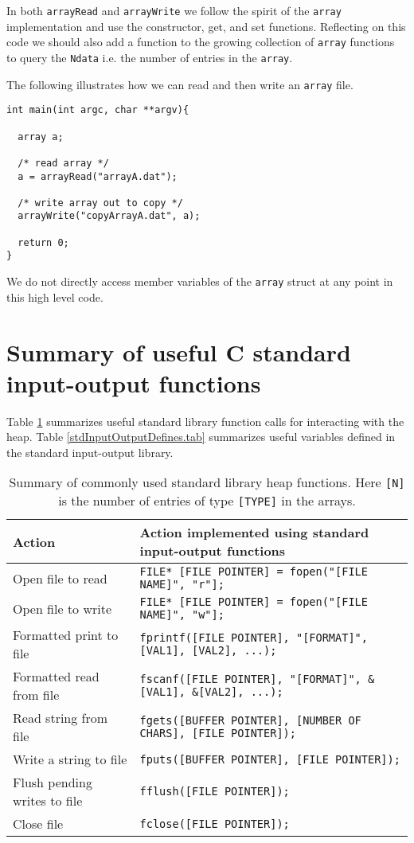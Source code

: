 In both \texttt{arrayRead} and \texttt{arrayWrite} we follow the spirit of the \texttt{array} implementation and use the constructor, get, and set functions. Reflecting on this code we should also add a function to the growing collection of \texttt{array} functions to query the \texttt{Ndata} i.e. the number of entries in the \texttt{array}.

The following illustrates how we can read and then write an \texttt{array} file.

\begin{verbatim}
int main(int argc, char **argv){

  array a;

  /* read array */
  a = arrayRead("arrayA.dat");

  /* write array out to copy */
  arrayWrite("copyArrayA.dat", a);

  return 0;
}
\end{verbatim}

We do not directly access member variables of the \texttt{array} struct at any point in this high level code.

\section{Summary of useful C standard input-output functions}

Table \ref{stdInputOutputFunctions.tab} summarizes useful standard library function calls for interacting with the heap. Table \ref{stdInputOutputDefines.tab} summarizes useful variables defined in the standard input-output library. 

\begin{table}[htbp!]
    \centering
    \begin{tabular}{l|l} \hline
      Action & Action implemented using standard input-output functions\\ \hline
        Open file to read&  \texttt{FILE* [FILE POINTER] =  fopen("[FILE NAME]", "r"];} \\
         Open file to write&  \texttt{FILE* [FILE POINTER] =  fopen("[FILE NAME]", "w"];} \\
         Formatted print to file &  \texttt{fprintf([FILE POINTER], 
         "[FORMAT]", [VAL1], [VAL2], ...);} \\
         Formatted read from file &  \texttt{fscanf([FILE POINTER], 
         "[FORMAT]", \&[VAL1], \&[VAL2], ...);} \\
         Read string from file & \texttt{fgets([BUFFER POINTER], [NUMBER OF CHARS], [FILE POINTER]);} \\
         Write a string to file & \texttt{fputs([BUFFER POINTER], [FILE POINTER]);} \\
         Flush pending writes to file & \texttt{fflush([FILE POINTER]);} \\
         Close file & \texttt{fclose([FILE POINTER]);} \\
    \hline\end{tabular}
    \caption{Summary of commonly used standard library heap functions. Here \texttt{[N]} is the number of entries of type \texttt{[TYPE]} in the arrays.}    
    \label{stdInputOutputFunctions.tab}
\end{table}


